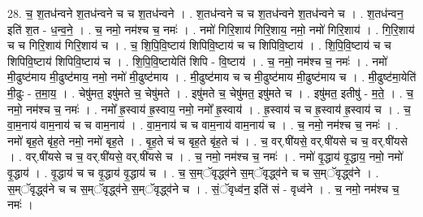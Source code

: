 \documentclass[17pt]{extarticle}
\begin{document}
28. च॒ श॒तध॑न्वने श॒तध॑न्वने च च श॒तध॑न्वने । . श॒तध॑न्वने च च श॒तध॑न्वने श॒तध॑न्वने च । . श॒तध॑न्वन॒ इति॑ श॒त - ध॒न्व॒ने॒ । . च॒ नमो॒ नम॑श्च च॒ नमः॑ । . नमो॑ गिरि॒शाय॑ गिरि॒शाय॒ नमो॒ नमो॑ गिरि॒शाय॑ । . गि॒रि॒शाय॑ च च गिरि॒शाय॑ गिरि॒शाय॑ च । . च॒ शि॒पि॒वि॒ष्टाय॑ शिपिवि॒ष्टाय॑ च च शिपिवि॒ष्टाय॑ । . शि॒पि॒वि॒ष्टाय॑ च च शिपिवि॒ष्टाय॑ शिपिवि॒ष्टाय॑ च । . शि॒पि॒वि॒ष्टायेति॑ शिपि - वि॒ष्टाय॑ । . च॒ नमो॒ नम॑श्च च॒ नमः॑ । . नमो॑ मी॒ढुष्ट॑माय मी॒ढुष्ट॑माय॒ नमो॒ नमो॑ मी॒ढुष्ट॑माय । . मी॒ढुष्ट॑माय च च मी॒ढुष्ट॑माय मी॒ढुष्ट॑माय च । . मी॒ढुष्ट॑मा॒येति॑ मी॒ढुः - त॒मा॒य॒ । . चेषु॑मत॒ इषु॑मते च॒ चेषु॑मते । . इषु॑मते च॒ चेषु॑मत॒ इषु॑मते च । . इषु॑मत॒ इतीषु॑ - म॒ते॒ । . च॒ नमो॒ नम॑श्च च॒ नमः॑ । . नमो᳚ ह्र॒स्वाय॑ ह्र॒स्वाय॒ नमो॒ नमो᳚ ह्र॒स्वाय॑ । . ह्र॒स्वाय॑ च च ह्र॒स्वाय॑ ह्र॒स्वाय॑ च । . च॒ वा॒म॒नाय॑ वाम॒नाय॑ च च वाम॒नाय॑ । . वा॒म॒नाय॑ च च वाम॒नाय॑ वाम॒नाय॑ च । . च॒ नमो॒ नम॑श्च च॒ नमः॑ । . नमो॑ बृह॒ते बृ॑ह॒ते नमो॒ नमो॑ बृह॒ते । . बृ॒ह॒ते च॑ च बृह॒ते बृ॑ह॒ते च॑ । . च॒ वर्.षी॑यसे॒ वर्.षी॑यसे च च॒ वर्.षी॑यसे । . वर्.षी॑यसे च च॒ वर्.षी॑यसे॒ वर्.षी॑यसे च । . च॒ नमो॒ नम॑श्च च॒ नमः॑ । . नमो॑ वृ॒द्धाय॑ वृ॒द्धाय॒ नमो॒ नमो॑ वृ॒द्धाय॑ । . वृ॒द्धाय॑ च च वृ॒द्धाय॑ वृ॒द्धाय॑ च । . च॒ स॒म्ॅवृद्ध्व॑ने स॒म्ॅवृद्ध्व॑ने च च स॒म्ॅवृद्ध्व॑ने । . स॒म्ॅवृद्ध्व॑ने च च स॒म्ॅवृद्ध्व॑ने स॒म्ॅवृद्ध्व॑ने च । . सं॒ॅवृध्व॑न॒ इति॑ सं - वृध्व॑ने । . च॒ नमो॒ नम॑श्च च॒ नमः॑ । \newline
\end{document}
